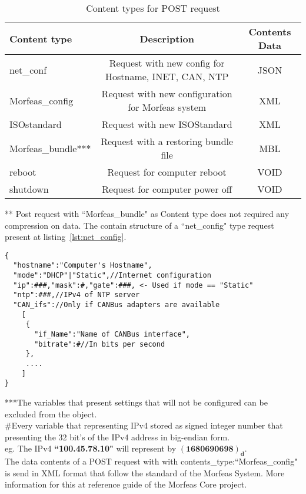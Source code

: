 \begin{table}[h]
\centering
\begin{tabular}{|l|c|c|}
 \hline
 \textbf{Content type} & \textbf{Description} & \textbf{Contents Data}\\
 \hline
 net\_conf & Request with new config for Hostname, INET, CAN, NTP & JSON \\
 Morfeas\_config & Request with new configuration for Morfeas system & XML\\
 ISOstandard &  Request with new ISOStandard &  XML\\
 Morfeas\_bundle*** & Request with a restoring bundle file & MBL \\
 reboot & Request for computer reboot & VOID \\
 shutdown & Request for computer power off & VOID \\
 \hline
\end{tabular}
\caption{Content types for POST request}
\label{table:POST_config}
\end{table}
\par*** Post request with ``Morfeas\_bundle" as Content type does not required any compression on data.
\newpage
The contain structure of a ``net\_config" type request present at listing~\ref{lst:net_config}.
\begin{lstlisting}[frame=single,caption=Structure of contents for POST request with ``contents\_type:net\_config",label=lst:net_config]
{
  "hostname":"Computer's Hostname",
  "mode":"DHCP"|"Static",//Internet configuration
  "ip":###,"mask":#,"gate":###, <- Used if mode == "Static"
  "ntp":###,//IPv4 of NTP server
  "CAN_ifs"://Only if CANBus adapters are available
    [
     {
       "if_Name":"Name of CANBus interface",
       "bitrate":#//In bits per second
     },
     ....
    ]
}
\end{lstlisting}

***The variables that present settings that will not be configured can be excluded from the object.\\
\#Every variable that representing IPv4 stored as signed integer number that presenting the 32 bit's of the IPv4 address in big-endian form.\\
eg. The IPv4 \textbf{``100.45.78.10"} will represent by $\mathbf{(1680690698)_d}$.\\

The data contents of a POST request with with contents\_type:``Morfeas\_config" is send in XML format that follow the standard of the Morfeas System.
More information for this at reference guide of the Morfeas Core project.

